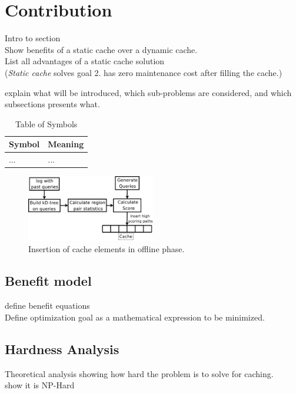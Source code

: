 \section{Contribution} \label{sec:contribution}

Intro to section \\
Show benefits of a static cache over a dynamic cache.\\
List all advantages of a static cache solution \\
(\textit{Static cache} solves goal 2. has zero maintenance cost after filling the cache.)

explain what will be introduced, which sub-problems are considered, and which subsections presents what.


\begin{table}
\begin{tabular*}{\columnwidth}{|l||p{}|}
\hline
\bf Symbol	& \bf Meaning \\\hline
...		& ... \\\hline
\end{tabular*}
\caption{Table of Symbols}
\label{tab:symbols}
\end{table}


\begin{figure}[bht]
  \center
        \includegraphics[width=0.5\textwidth]{figures/fillcache}
        \caption{Insertion of cache elements in offline phase.}
  \label{fig:fillcache}
\end{figure}


\subsection{Benefit model}
define benefit equations\\
Define optimization goal as a mathematical expression to be minimized.

\subsection{Hardness Analysis}
Theoretical analysis showing how hard the problem is to solve for \spath caching.\\
show it is NP-Hard
 

